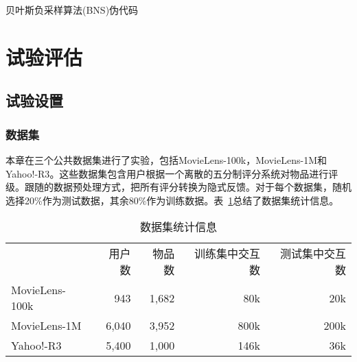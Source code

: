\begin{algorithm}[!]
	\small
	\caption{贝叶斯负采样算法(BNS)伪代码}\label{Alg:1}
\end{algorithm}
\section{试验评估}
\subsection{试验设置}
\subsubsection{数据集}
本章在三个公共数据集进行了实验，包括MovieLens-100k，MovieLens-1M和Yahoo!-R3\cite{Xuejiao:2020:ASC}。这些数据集包含用户根据一个离散的五分制评分系统对物品进行评级。跟随\cite{Steffen:2009:UAI}的数据预处理方式，把所有评分转换为隐式反馈。对于每个数据集，随机选择20\%作为测试数据，其余80\%作为训练数据。表~\ref{3Table:Dataset}总结了数据集统计信息。
\begin{table}[h]
	\centering
	\small
	\caption{数据集统计信息}\label{3Table:Dataset}
	\begin{tabular}{lrrrr}
		\toprule[1.2pt]
		~           & 用户数   & 物品数   & 训练集中交互数  &测试集中交互数  \\ \cline{1-5}
		MovieLens-100k   &   943    &  1,682   &    80k	   & 20k 	\\
		MovieLens-1M    &   6,040  &  3,952   &   800k     & 200k  \\
		Yahoo!-R3       &   5,400  &  1,000   &   146k      & 36k  \\
		\bottomrule[1.2pt]
	\end{tabular}
\end{table}
